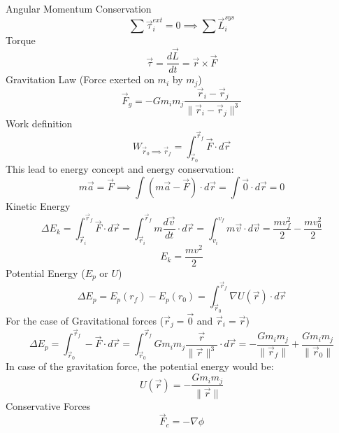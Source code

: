 \documentclass{article}
\begin{document}
Angular Momentum Conservation
\begin{equation}
  \sum \vec{\tau}^{ext}_i = 0 \implies \sum \vec{L}^{sys}_i
\end{equation}
Torque
\begin{equation}
  \vec{\tau} = \frac{d\vec{L}}{dt} = \vec{r} \times \vec{F}
\end{equation}
Gravitation Law (Force exerted on $m_i$ by $m_j$)
\begin{equation}
  \vec{F}_g = -Gm_im_j\frac{\vec{r}_i - \vec{r}_j}{\|\vec{r}_i - \vec{r}_j\|^3}
\end{equation}
Work definition
\begin{equation}
  W_{\vec{r}_0 \implies \vec{r}_f} = \int_{\vec{r}_0}^{\vec{r}_f}\vec{F} \cdot d\vec{r}
\end{equation}
This lead to energy concept and energy conservation:
\begin{equation}
  m\vec{a} = \vec{F} \implies \int (m\vec{a} - \vec{F}) \cdot d\vec{r} = \int \vec{0} \cdot d\vec{r} = 0 
\end{equation}
Kinetic Energy
\begin{equation}
\Delta E_k = \int_{\vec{r}_i}^{\vec{r}_f}\vec{F} \cdot d\vec{r} = \int_{\vec{r}_i}^{\vec{r}_f}m\frac{d\vec{v}}{dt} \cdot d\vec{r} = \int_{v_i}^{v_f}m\vec{v} \cdot d\vec{v} = \frac{mv_f^2}{2} - \frac{mv_0^2}{2}
\end{equation}
\begin{equation}
  E_k = \frac{mv^2}{2}
\end{equation}
Potential Energy ($E_p$ or $U$)
\begin{equation}
  \Delta E_p = E_p(r_f) - E_p(r_0) =  \int_{\vec{r}_0}^{\vec{r}_f}\nabla U(\vec{r})\cdot d\vec{r}
\end{equation}
For the case of Gravitational forces ($\vec{r}_j = \vec{0}$ and $\vec{r}_i = \vec{r}$)
\begin{equation}
  \Delta E_p = \int_{\vec{r}_0}^{\vec{r}_f} -\vec{F} \cdot d\vec{r} = \int_{\vec{r}_0}^{\vec{r}_f} Gm_im_j\frac{\vec{r}}{\|\vec{r}\|^3} \cdot d\vec{r} = -\frac{Gm_im_j}{\|\vec{r}_f\|} + \frac{Gm_im_j}{\|\vec{r}_0\|} 
\end{equation}
In case of the gravitation force, the potential energy would be:
\begin{equation}
  U(\vec{r}) = -\frac{Gm_im_j}{\|\vec{r}\|} 
\end{equation}
Conservative Forces
\begin{equation}
  \vec{F}_c = - \nabla \phi
\end{equation}
\end{document}
